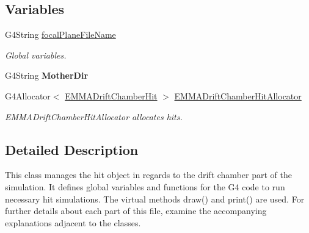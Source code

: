 \subsection*{Variables}
\begin{DoxyCompactItemize}
\item 
\hypertarget{EMMADriftChamberHit_8hh_a3dbaf7156a8d958508b9806a0ef50aa6}{G4\-String \hyperlink{EMMADriftChamberHit_8hh_a3dbaf7156a8d958508b9806a0ef50aa6}{focal\-Plane\-File\-Name}}\label{EMMADriftChamberHit_8hh_a3dbaf7156a8d958508b9806a0ef50aa6}

\begin{DoxyCompactList}\small\item\em Global variables. \end{DoxyCompactList}\item 
\hypertarget{EMMADriftChamberHit_8hh_a28a3faf9b4768b420044f0d81fa645b7}{G4\-String {\bfseries Mother\-Dir}}\label{EMMADriftChamberHit_8hh_a28a3faf9b4768b420044f0d81fa645b7}

\item 
\hypertarget{EMMADriftChamberHit_8hh_a69d77018fbd217765f66a3ea52ee314f}{G4\-Allocator$<$ \hyperlink{classEMMADriftChamberHit}{E\-M\-M\-A\-Drift\-Chamber\-Hit} $>$ \hyperlink{EMMADriftChamberHit_8hh_a69d77018fbd217765f66a3ea52ee314f}{E\-M\-M\-A\-Drift\-Chamber\-Hit\-Allocator}}\label{EMMADriftChamberHit_8hh_a69d77018fbd217765f66a3ea52ee314f}

\begin{DoxyCompactList}\small\item\em E\-M\-M\-A\-Drift\-Chamber\-Hit\-Allocator allocates hits. \end{DoxyCompactList}\end{DoxyCompactItemize}


\subsection{Detailed Description}
This class manages the hit object in regards to the drift chamber part of the simulation. It defines global variables and functions for the G4 code to run necessary hit simulations. The virtual methods draw() and print() are used. For further details about each part of this file, examine the accompanying explanations adjacent to the classes. 